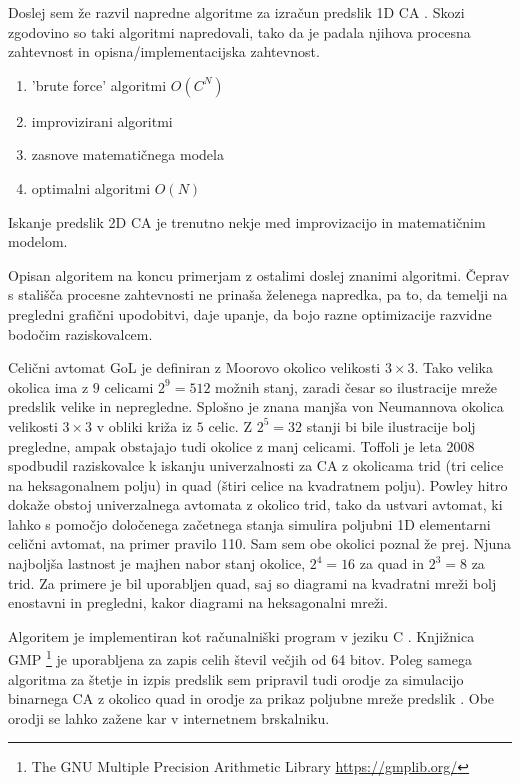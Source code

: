 \documentclass[12pt,a4paper,openany,twoside]{book}
\begin{document}
Doslej sem že razvil napredne algoritme za izračun predslik 1D CA \cite{JerasDobnikar2007}.
Skozi zgodovino so taki algoritmi napredovali, tako da je padala njihova
procesna zahtevnost in opisna/implementacijska zahtevnost.
\begin{enumerate}
 \item 'brute force' algoritmi \( O(C^N) \)
 \item improvizirani algoritmi
 \item zasnove matematičnega modela
 \item optimalni algoritmi \( O(N) \)
\end{enumerate}
Iskanje predslik 2D CA je trenutno nekje med improvizacijo in matematičnim modelom.

Opisan algoritem na koncu primerjam z ostalimi doslej znanimi algoritmi.
Čeprav s stališča procesne zahtevnosti ne prinaša želenega napredka,
pa to, da temelji na pregledni grafični upodobitvi, daje upanje,
da bojo razne optimizacije razvidne bodočim raziskovalcem.

Celični avtomat GoL je definiran z Moorovo okolico velikosti \(3 \times 3\).
Tako velika okolica ima z \(9\) celicami \(2^9=512\) možnih stanj,
zaradi česar so ilustracije mreže predslik velike in nepregledne.
Splošno je znana manjša von Neumannova okolica velikosti \(3 \times 3\) v obliki križa iz \(5\) celic.
Z \(2^5=32\) stanji bi bile ilustracije bolj pregledne, ampak obstajajo tudi okolice z manj celicami.
Toffoli \cite{Toffoli2008} je leta 2008 spodbudil raziskovalce k iskanju univerzalnosti za CA
z okolicama trid (tri celice na heksagonalnem polju) in quad (štiri celice na kvadratnem polju).
Powley \cite{Powley2008} hitro dokaže obstoj univerzalnega avtomata z okolico trid,
tako da ustvari avtomat, ki lahko s pomočjo določenega začetnega stanja
simulira poljubni 1D elementarni celični avtomat, na primer pravilo 110.
Sam sem obe okolici poznal že prej. Njuna najboljša lastnost je majhen nabor stanj okolice,
\(2^4=16\) za quad in \(2^3=8\) za trid. Za primere je bil uporabljen quad,
saj so diagrami na kvadratni mreži bolj enostavni in pregledni, kakor diagrami na heksagonalni mreži.

Algoritem je implementiran kot računalniški program v jeziku C \cite{Jeras2016-algirithm}.
Knjižnica GMP \footnote{The GNU Multiple Precision Arithmetic Library \url{https://gmplib.org/}}
je uporabljena za zapis celih števil večjih od 64 bitov.
Poleg samega algoritma za štetje in izpis predslik sem pripravil tudi
orodje za simulacijo binarnega CA z okolico quad \cite{Jeras2016-quad}
in orodje za prikaz poljubne mreže predslik \cite{Jeras2016-network}.
Obe orodji se lahko zažene kar v internetnem brskalniku.
\end{document}
